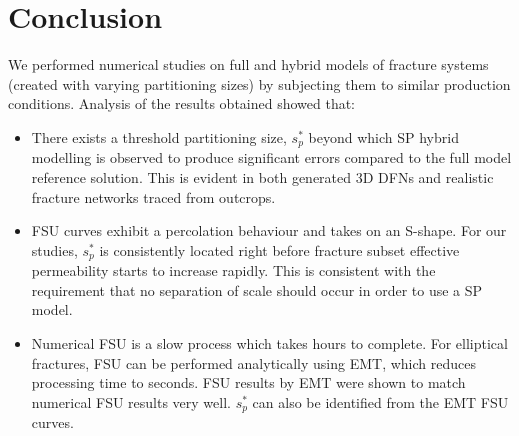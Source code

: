 \documentclass[a4paper]{article}
\begin{document}
\section{Conclusion}
We performed numerical studies on full and hybrid models of fracture systems (created with varying partitioning sizes) by subjecting them to similar production conditions. Analysis of the results obtained showed that:

\begin{itemize}
    \item There exists a threshold partitioning size, $s_p^*$ beyond which SP hybrid modelling is observed to produce significant errors compared to the full model reference solution. This is evident in both generated 3D DFNs and realistic fracture networks traced from outcrops.
    
    \item FSU curves exhibit a percolation behaviour and takes on an S-shape. For our studies, $s_p^*$ is consistently located right before fracture subset effective permeability starts to increase rapidly. This is consistent with the requirement that no separation of scale should occur in order to use a SP model.
    
    \item Numerical FSU is a slow process which takes hours to complete. For elliptical fractures, FSU can be performed analytically using EMT, which reduces processing time to seconds. FSU results by EMT were shown to match numerical FSU results very well. $s_p^*$ can also be identified from the EMT FSU curves. 
    
\end{itemize}



\end{document}
